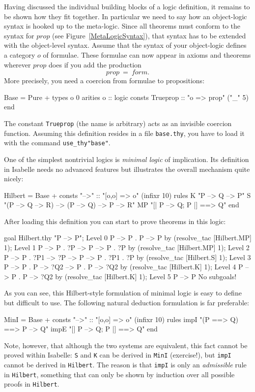 Having discussed the individual building blocks of a logic definition, it
remains to be shown how they fit together.  In particular we need to say how
an object-logic syntax is hooked up to the meta-logic.  Since all theorems
must conform to the syntax for $prop$ (see Figure~\ref{MetaLogicSyntax}),
that syntax has to be extended with the object-level syntax.  Assume that the
syntax of your object-logic defines a category $o$ of formulae.  These
formulae can now appear in axioms and theorems wherever $prop$ does if you
add the production
\[ prop ~=~ form.  \]
More precisely, you need a coercion from formulae to propositions:
\begin{ttbox}
Base = Pure +
types o 0
arities o :: logic
consts Trueprop :: "o => prop"  ("_"  5)
end
\end{ttbox}
The constant {\tt Trueprop} (the name is arbitrary) acts as an invisible
coercion function.  Assuming this definition resides in a file {\tt base.thy},
you have to load it with the command {\tt use_thy"base"}.

One of the simplest nontrivial logics is {\em minimal logic} of
implication.  Its definition in Isabelle needs no advanced features but
illustrates the overall mechanism quite nicely:
\begin{ttbox}
Hilbert = Base +
consts "-->" :: "[o,o] => o"  (infixr 10)
rules
K   "P --> Q --> P"
S   "(P --> Q --> R) --> (P --> Q) --> P --> R"
MP  "[| P --> Q; P |] ==> Q"
end
\end{ttbox}
After loading this definition you can start to prove theorems in this logic:
\begin{ttbox}
goal Hilbert.thy "P --> P";
{\out Level 0}
{\out P --> P}
{.  P --> P}
by (resolve_tac [Hilbert.MP] 1);
{\out Level 1}
{\out P --> P}
{.  ?P --> P --> P}
{.  ?P}
by (resolve_tac [Hilbert.MP] 1);
{\out Level 2}
{\out P --> P}
{.  ?P1 --> ?P --> P --> P}
{.  ?P1}
{.  ?P}
by (resolve_tac [Hilbert.S] 1);
{\out Level 3}
{\out P --> P}
{.  P --> ?Q2 --> P}
{.  P --> ?Q2}
by (resolve_tac [Hilbert.K] 1);
{\out Level 4}
{\out P --> P}
{.  P --> ?Q2}
by (resolve_tac [Hilbert.K] 1);
{\out Level 5}
{\out P --> P}
{\out No subgoals!}
\end{ttbox}
As you can see, this Hilbert-style formulation of minimal logic is easy to
define but difficult to use.  The following natural deduction formulation is
far preferable:
\begin{ttbox}
MinI = Base +
consts "-->" :: "[o,o] => o"  (infixr 10)
rules
impI  "(P ==> Q) ==> P --> Q"
impE  "[| P --> Q; P |] ==> Q"
end
\end{ttbox}
Note, however, that although the two systems are equivalent, this fact cannot
be proved within Isabelle: {\tt S} and {\tt K} can be derived in \verb$MinI$
(exercise!), but {\tt impI} cannot be derived in \verb!Hilbert!.  The reason
is that {\tt impI} is only an {\em admissible} rule in \verb!Hilbert!,
something that can only be shown by induction over all possible proofs in
\verb!Hilbert!.


